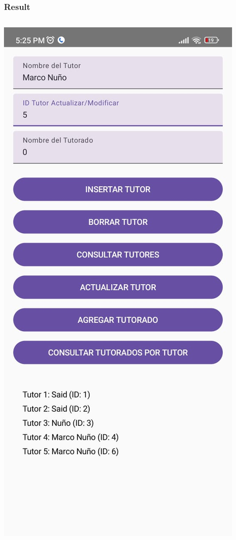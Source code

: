 \documentclass[pdf,
serif,
compress,
xcolor=table,
dvipsnames,
spanish,
aspectratio=169]{beamer}
\begin{document}
\begin{frame}
    \frametitle{Result}

    \begin{columns}
        \begin{center}
            \includegraphics[width=0.7\linewidth]{graphics/Consultar Tutor.jpeg} %
        \end{center}


\end{columns}
\end{frame}
\end{document}
